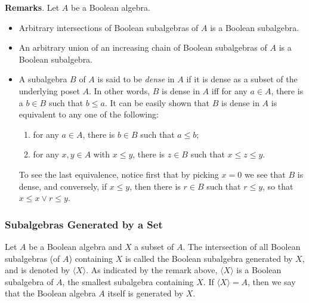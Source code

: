 \documentclass[12pt]{article}
\begin{document}
\textbf{Remarks}.  Let $A$ be a Boolean algebra.
\begin{itemize}
\item Arbitrary intersections of Boolean subalgebras of $A$ is a Boolean subalgebra.  
\item An arbitrary union of an increasing chain of Boolean subalgebras of $A$ is a Boolean subalgebra.
\item A subalgebra $B$ of $A$ is said to be \emph{dense} in $A$ if it is dense as a subset of the underlying poset $A$.  In other words, $B$ is dense in $A$ iff for any $a\in A$, there is a $b\in B$ such that $b\le a$.  It can be easily shown that $B$ is dense in $A$ is equivalent to any one of the following: 
\begin{enumerate}
\item for any $a\in A$, there is $b\in B$ such that $a\le b$;
\item for any $x,y\in A$ with $x\le y$, there is $z\in B$ such that $x\le z\le y$.  
\end{enumerate}
To see the last equivalence, notice first that by picking $x=0$ we see that $B$ is dense, and conversely, if $x\le y$, then there is $r\in B$ such that $r\le y$, so that $x\le x\vee r\le y$.
\end{itemize}

\subsubsection*{Subalgebras Generated by a Set}

Let $A$ be a Boolean algebra and $X$ a subset of $A$.  The intersection of all Boolean subalgebras (of $A$) containing $X$ is called the Boolean subalgebra generated by $X$, and is denoted by $\langle X\rangle$.  As indicated by the remark above, $\langle X\rangle$ is a Boolean subalgebra of $A$, the smallest subalgebra containing $X$.  If $\langle X\rangle = A$, then we say that the Boolean algebra $A$ itself is generated by $X$.
\end{document}
